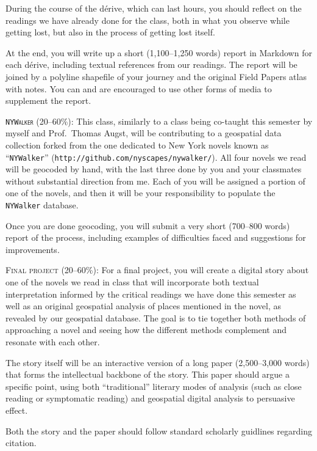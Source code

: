\begin{description}
    During the course of the dérive, which can last hours, you should reflect
    on the readings we have already done for the class, both in what you
    observe while getting lost, but also in the process of getting lost itself.
    
    At the end, you will write up a short (1,100--1,250 words) report in
    Markdown for each dérive, including textual references from our readings.
    The report will be joined by a polyline shapefile of your journey and the
    original Field Papers atlas with notes. You can and are encouraged to use
    other forms of media to supplement the report.

  \item \textsc{\texttt{NYWalker} (20–60\%):} This class, similarly to a class
    being co-taught this semester by myself and Prof.\ Thomas Augst, will be
    contributing to a geospatial data collection forked from the one dedicated
    to New York novels known as “\texttt{NYWalker}”
    (\texttt{http://github.com/nyscapes/nywalker/}).  All four novels we read
    will be geocoded by hand, with the last three done by you and your
    classmates without substantial direction from me. Each of you will be
    assigned a portion of one of the novels, and then it will be your
    responsibility to populate the \texttt{NYWalker} database.

    Once you are done geocoding, you will submit a very short (700--800
    words) report of the process, including examples of difficulties faced and
    suggestions for improvements.

  \item \textsc{Final project (20–60\%):} For a final project, you will create a
    digital story about one of the novels we read in class that will
    incorporate both textual interpretation informed by the critical readings
    we have done this semester as well as an original geospatial analysis of
    places mentioned in the novel, as revealed by our geospatial database. The
    goal is to tie together both methods of approaching a novel and seeing how
    the different methods complement and resonate with each other.

    The story itself will be an interactive version of a long paper
    (2,500--3,000 words) that forms the intellectual backbone of the story.
    This paper should argue a specific point, using both “traditional” literary
    modes of analysis (such as close reading or symptomatic reading) and
    geospatial digital analysis to persuasive effect.

    Both the story and the paper should follow standard scholarly guidlines
    regarding citation.

\end{description}
